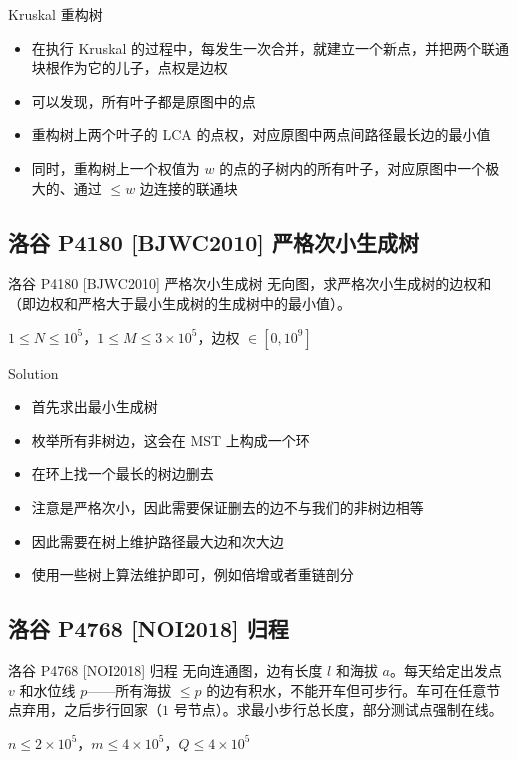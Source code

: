 ﻿\documentclass[aspectratio=169]{ctexbeamer}
\begin{document}
\begin{frame}{Kruskal 重构树}
    \begin{itemize}
        \item 在执行 Kruskal 的过程中，每发生一次合并，就建立一个新点，并把两个联通块根作为它的儿子，点权是边权
        \item 可以发现，所有叶子都是原图中的点
        \item 重构树上两个叶子的 LCA 的点权，对应原图中两点间路径最长边的最小值
        \item 同时，重构树上一个权值为 $w$ 的点的子树内的所有叶子，对应原图中一个极大的、通过 $\le w$ 边连接的联通块
    \end{itemize}
\end{frame}



\subsection{洛谷 P4180 [BJWC2010] 严格次小生成树}

\begin{frame}{洛谷 P4180 [BJWC2010] 严格次小生成树}
      无向图，求严格次小生成树的边权和（即边权和严格大于最小生成树的生成树中的最小值）。
      
      $1\le N\le 10^5$，$1\le M\le 3\times 10^5$，边权 $\in[0,10^9]$
\end{frame}

\begin{frame}{Solution}
    \begin{itemize}
        \item 首先求出最小生成树
        \item 枚举所有非树边，这会在 MST 上构成一个环
        \item 在环上找一个最长的树边删去
        \item 注意是严格次小，因此需要保证删去的边不与我们的非树边相等
        \item 因此需要在树上维护路径最大边和次大边
        \item 使用一些树上算法维护即可，例如倍增或者重链剖分
    \end{itemize}
\end{frame}

\subsection{洛谷 P4768 [NOI2018] 归程}

\begin{frame}{洛谷 P4768 [NOI2018] 归程}
      无向连通图，边有长度 $l$ 和海拔 $a$。每天给定出发点 $v$ 和水位线 $p$——所有海拔 $\le p$ 的边有积水，不能开车但可步行。车可在任意节点弃用，之后步行回家（$1$ 号节点）。求最小步行总长度，部分测试点强制在线。
      
      $n\le 2\times 10^5$，$m\le 4\times 10^5$，$Q\le 4\times 10^5$
\end{frame}
\end{document}
